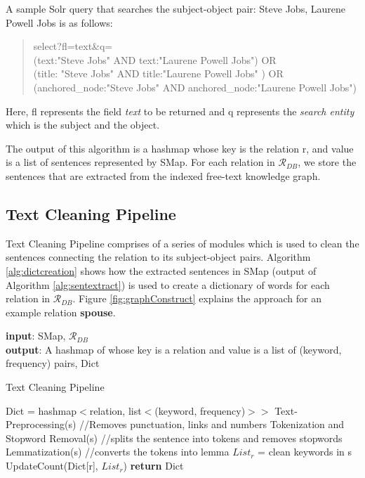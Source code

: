 \begin{sloppypar}
A sample Solr query that searches the subject-object pair: Steve Jobs, Laurene Powell Jobs is as follows:
\begin{quote}
{\selectfont select?fl=text\&q= \\
(text:"Steve Jobs" AND text:"Laurene Powell Jobs") OR \\
(title: "Steve Jobs" AND title:"Laurene Powell Jobs" ) OR \\
(anchored\_node:"Steve Jobs" AND anchored\_node:"Laurene Powell Jobs")}
\end{quote}
Here, fl represents the field \textit{text} to be returned and q represents the \textit{search entity} which is the subject and the object. 

The output of this algorithm is a hashmap whose key is the relation r, and value is a list of sentences represented by SMap. For each relation in $\mathcal{R}_{DB}$, we store the sentences that are extracted from the indexed free-text knowledge graph.

\subsection{Text Cleaning Pipeline}
\label{sec:TextCleaningPipeline}
Text Cleaning Pipeline comprises of a series of modules which is used to clean the sentences connecting the relation to its subject-object pairs.
Algorithm \ref{alg:dictcreation} shows how the extracted sentences in SMap (output of Algorithm \ref{alg:sentextract}) is used to create a dictionary of words for each relation in $\mathcal{R}_{DB}$. Figure \ref{fig:graphConstruct} explains the approach for an example relation \textbf{spouse}. 

\begin{singlespace}
\begin{algorithm}
 \hspace*{\algorithmicindent} \textbf{input}: SMap, $\mathcal{R}_{DB}$  \\
 \hspace*{\algorithmicindent} \textbf{output}: A hashmap of whose key is a relation and value is a list of (keyword, frequency) pairs, Dict
\begin{algorithmic}[1]
\caption{Text Cleaning Pipeline}\label{alg:dictcreation}
\State Dict = hashmap$<$relation, list$<$(keyword, frequency)$>>$
    \State Text-Preprocessing(s) //Removes punctuation, links and numbers
    \State Tokenization and Stopword Removal(s) //splits the sentence into tokens and removes stopwords
    \State Lemmatization(s) //converts the tokens into lemma
    \State $List_{r}$ = clean keywords in s
    \State UpdateCount(Dict[r], $List_{r}$)
\EndFor
\EndFor
\State \textbf{return} Dict
\end{algorithmic}
\end{algorithm}
\end{singlespace}


\end{sloppypar}
